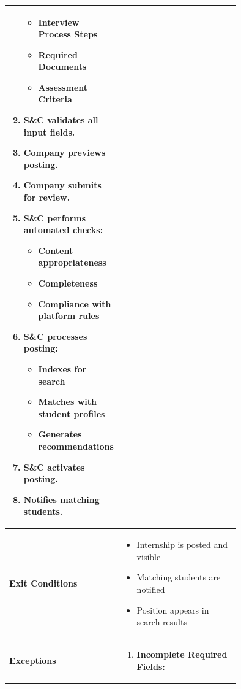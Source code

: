 \begin{center}
\begin{longtable}{|l|p{0.75\linewidth}|}
\begin{enumerate}
            \begin{itemize}
                \item Interview Process Steps
                \item Required Documents
                \item Assessment Criteria
            \end{itemize}
            \item S\&C validates all input fields.
            \item Company previews posting.
            \item Company submits for review.
            \item S\&C performs automated checks:
            \begin{itemize}
                \item Content appropriateness
                \item Completeness
                \item Compliance with platform rules
            \end{itemize}
            \item S\&C processes posting:
            \begin{itemize}
                \item Indexes for search
                \item Matches with student profiles
                \item Generates recommendations
            \end{itemize}
            \item S\&C activates posting.
            \item Notifies matching students.
        \end{enumerate} \\
        \hline
        \textbf{Exit Conditions}   & 
        \begin{itemize}
            \item Internship is posted and visible
            \item Matching students are notified
            \item Position appears in search results
        \end{itemize} \\
        \hline
        \textbf{Exceptions}       & 
        \begin{enumerate}
            \item \textbf{Incomplete Required Fields:} \begin{itemize}

\end{itemize}
\end{enumerate}
\end{longtable}
\end{center}
